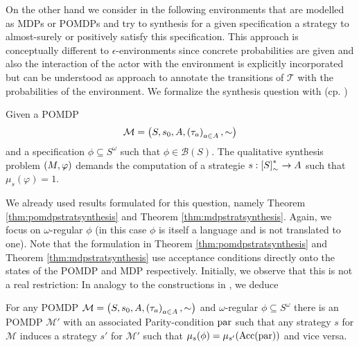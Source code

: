 On the other hand we consider in the following environments that are modelled 
as \acp{MDP} or \acp{POMDP} and try to synthesis for a given specification a 
strategy to almost-surely or positively satisfy this specification. This 
approach is conceptually different to $\epsilon$-environments since concrete 
probabilities are given and also the interaction of the actor with the 
environment is explicitly incorporated but can be understood as approach to 
annotate the transitions of $\mathcal{T}$ with the probabilities of the 
environment. We formalize the synthesis question with (cp. 
\cite{QualAnaPOMDP,SimpleStochasticParityGames,ComplexProbVerification})
\begin{definition}
  Given a \ac{POMDP} 
  \begin{equation*}
    \mathcal{M} = \left(S, s_{0}, A, \left(\tau_{a}\right)_{a\in A}, \sim\right)
  \end{equation*}
  and a specification $\phi\subseteq S^{\omega}$ such that 
  $\phi\in\mathcal{B}(S)$. The qualitative synthesis problem 
  $\left(M, \varphi\right)$ demands the computation of a strategie 
  $s:\left[S\right]_{\sim}^{*}\rightarrow A$ such that $\mu_{s}(\varphi) = 1$.
\end{definition}
We already used results formulated for this question, namely Theorem 
\ref{thm:pomdpstratsynthesis} and Theorem \ref{thm:mdpstratsynthesis}. Again,
we focus on $\omega$-regular $\phi$ (in this case $\phi$ is itself a language
and is not translated to one). Note that the formulation in Theorem 
\ref{thm:pomdpstratsynthesis} and Theorem \ref{thm:mdpstratsynthesis} use 
acceptance conditions directly onto the states of the \ac{POMDP} and \ac{MDP}
respectively. Initially, we observe that this is not a real restriction:
In analogy to the constructions in
\cite{ComplexProbVerification,MDPandRegEvents}, we deduce
\begin{lemma}
  For any \ac{POMDP} $\mathcal{M} = \left(S, s_{0}, A, 
  \left(\tau_{a}\right)_{a\in A}, \sim\right)$ and $\omega$-regular 
  $\phi\subseteq S^{\omega}$ there is an \ac{POMDP} $\mathcal{M'}$ with an 
  associated Parity-condition $\operatorname{par}$ such that any strategy $s$ for 
  $\mathcal{M}$ induces a strategy $s'$ for $\mathcal{M'}$ such that 
  $\mu_{s}(\phi) = \mu_{s'}(\operatorname{Acc}(\operatorname{par}))$ and vice versa.
  \label{lem:POMDPomegareg}
\end{lemma}
